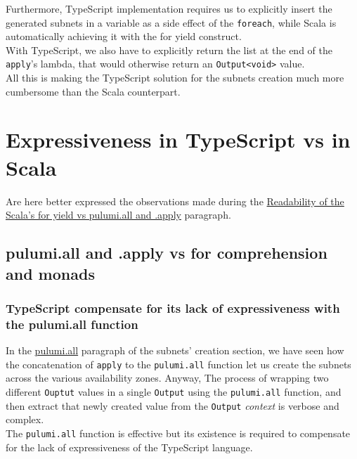 Furthermore, TypeScript implementation requires us to explicitly insert the generated subnets in a variable as a side effect of the \texttt{foreach}, while Scala is automatically achieving it with the for yield construct.\\
With TypeScript, we also have to explicitly return the list at the end of the \texttt{apply}'s lambda, that would otherwise return an \texttt{Output<void>} value.\\
All this is making the TypeScript solution for the subnets creation much more cumbersome than the Scala counterpart.


\section{Expressiveness in TypeScript vs in Scala}
Are here better expressed the observations made during the \hyperref[sssec:readability-for-yield]{Readability of the Scala's for yield vs pulumi.all and .apply} paragraph.

\subsection{pulumi.all and .apply vs for comprehension and monads}

\subsubsection{TypeScript compensate for its lack of expressiveness with the pulumi.all function}
In the \hyperref[sssec:pulumi-all]{pulumi.all} paragraph of the subnets' creation section, we have seen how the concatenation of \texttt{apply} to the \texttt{pulumi.all} function let us create the subnets across the various availability zones.
Anyway, The process of wrapping two different \texttt{Ouptut} values in a single \texttt{Output} using the \texttt{pulumi.all} function, and then extract that newly created value from the \texttt{Output} \textit{context} is verbose and complex.\\
The \texttt{pulumi.all} function is effective but its existence is required to compensate for the lack of expressiveness of the TypeScript language.

